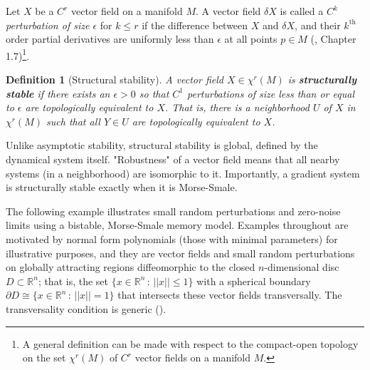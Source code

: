 \documentclass[12pt]{article}
\newtheorem{definition}[theorem]{Definition}
\begin{document}
Let $X$ be a $C^r$ vector field on a manifold $M$. A vector field $\delta X$ is called a \textit{${C^k}$ perturbation of size ${\epsilon}$} for $k \leq r$ if the difference between $X$ and $\delta X$, and their $k^{\text{th}}$ order partial derivatives are uniformly less than $\epsilon$ at all points $p \in M$ (\cite{guckenheimer2013nonlinear}, Chapter 1.7)\footnote{A general definition can be made with respect to the compact-open topology on the set $\chi^r(M)$ of $C^r$ vector fields on a manifold $M$.}.

\begin{definition}[Structural stability]
\label{definition:structural-stability}
    A vector field $X \in \chi^r(M)$ is \textbf{\textit{structurally stable}} if there exists an $\epsilon>0$ so that $C^1$ perturbations of size less than or equal to $\epsilon$ are topologically equivalent to $X$. That is, there is a neighborhood $U$ of $X$ in $\chi^r(M)$ such that all $Y \in U$ are topologically equivalent to $X$.
\end{definition}

Unlike asymptotic stability, structural stability is global, defined by the dynamical system itself. "Robustness" of a vector field means that all nearby systems (in a neighborhood) are isomorphic to it. Importantly, a gradient system is structurally stable exactly when it is Morse-Smale. 

The following example illustrates small random perturbations and zero-noise limits using a bistable, Morse-Smale memory model. Examples throughout are motivated by normal form polynomials (those with minimal parameters) for illustrative purposes, and they are vector fields and small random perturbations on globally attracting regions diffeomorphic to the closed $n$-dimensional disc $D \subset \mathbb{R}^n$; that is, the set $\{ x \in \mathbb{R}^n \, : \, ||x|| \leq 1 \}$ with a spherical boundary $\partial D \cong \{ x \in \mathbb{R}^n \, : \, ||x|| = 1 \}$ that intersects these vector fields transversally. The transversality condition is generic ().
\end{document}

